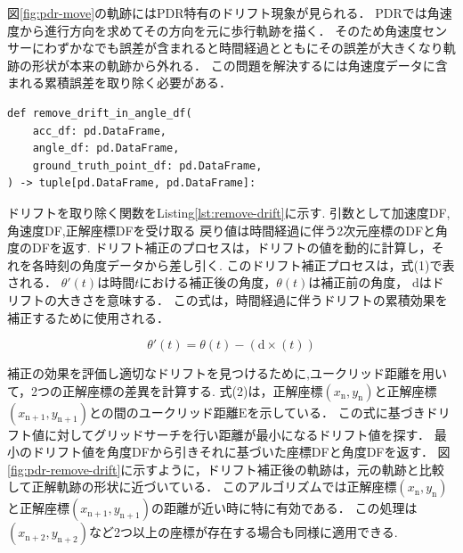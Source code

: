 図\ref{fig:pdr-move}の軌跡にはPDR特有のドリフト現象が見られる．
PDRでは角速度から進行方向を求めてその方向を元に歩行軌跡を描く．
そのため角速度センサーにわずかなでも誤差が含まれると時間経過とともにその誤差が大きくなり軌跡の形状が本来の軌跡から外れる．
この問題を解決するには角速度データに含まれる累積誤差を取り除く必要がある．


\begin{lstlisting}[caption={ドリフト除去}, label=lst:remove-drift]
def remove_drift_in_angle_df(
    acc_df: pd.DataFrame,
    angle_df: pd.DataFrame,
    ground_truth_point_df: pd.DataFrame,
) -> tuple[pd.DataFrame, pd.DataFrame]:
\end{lstlisting}

ドリフトを取り除く関数をListing\ref{lst:remove-drift}に示す.
引数として加速度DF,角速度DF,正解座標DFを受け取る
戻り値は時間経過に伴う2次元座標のDFと角度のDFを返す.
ドリフト補正のプロセスは，ドリフトの値を動的に計算し，それを各時刻の角度データから差し引く.
このドリフト補正プロセスは，式(1)で表される．
$\theta'(t)$は時間$t$における補正後の角度，$\theta(t)$は補正前の角度，
$\mathrm{d}$はドリフトの大きさを意味する．
この式は，時間経過に伴うドリフトの累積効果を補正するために使用される．

\vspace{5mm} %

\begin{equation}
	\theta'(t) = \theta(t) - (\mathrm{d} \times (t))
\end{equation}

\vspace{5mm} %

補正の効果を評価し適切なドリフトを見つけるために,ユークリッド距離を用いて，2つの正解座標の差異を計算する.
式(2)は，正解座標$(x_{\mathrm{n}}, y_{\mathrm{n}})$と正解座標$(x_{\mathrm{n+1}}, y_{\mathrm{n+1}})$との間のユークリッド距離$\mathrm{E}$を示している．
この式に基づきドリフト値に対してグリッドサーチを行い距離が最小になるドリフト値を探す．
最小のドリフト値を角度DFから引きそれに基づいた座標DFと角度DFを返す．
図\ref{fig:pdr-remove-drift}に示すように，ドリフト補正後の軌跡は，元の軌跡と比較して正解軌跡の形状に近づいている．
このアルゴリズムでは正解座標$(x_{\mathrm{n}}, y_{\mathrm{n}})$と正解座標$(x_{\mathrm{n+1}}, y_{\mathrm{n+1}})$の距離が近い時に特に有効である．
この処理は$(x_{\mathrm{n+2}}, y_{\mathrm{n+2}})$など2つ以上の座標が存在する場合も同様に適用できる.

